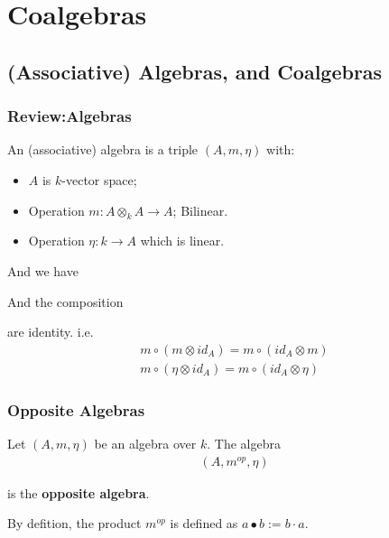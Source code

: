 \documentclass[Total.tex]{subfiles}
\begin{document}
	\chapter{Coalgebras}
		\section{(Associative) Algebras, and Coalgebras}
		\subsection{Review:Algebras}
		\begin{Def}
			An (associative) algebra is a triple $(A,m,\eta)$ with:
			\begin{itemize}
				\item $A$ is $k$-vector space;
				\item Operation $m:A\otimes_k A\rightarrow A$; Bilinear.
				\item Operation $\eta:k\rightarrow A$ which is linear.
			\end{itemize}
			
			And we have
			\begin{center}
			\end{center}
			
			And the composition
			\begin{center}
			\end{center}
			
			are identity. i.e.
			\begin{gather*}
				m\circ (m\otimes id_A)=m\circ (id_A\otimes m)\\
				m\circ (\eta\otimes id_A)=m\circ (id_A\otimes \eta)
			\end{gather*}
		\end{Def}
		\subsection{Opposite Algebras}
		\begin{Def}
			Let $(A,m,\eta)$ be an algebra over $k$. The algebra
			\begin{gather*}
				(A,m^{op},\eta)
			\end{gather*}
			
			is the \textbf{opposite algebra}.
			
			By defition, the product $m^{op}$ is defined as $a\bullet b:=b\cdot a$.
		\end{Def}
		
\end{document}
